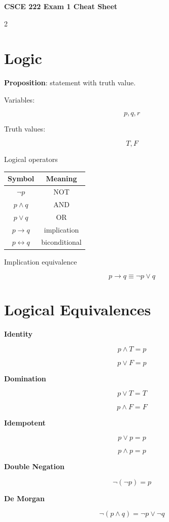 \documentclass[9pt]{article}
\begin{document}
\begin{center}
\Large \textbf{CSCE 222 Exam 1 Cheat Sheet}
\end{center}

\begin{multicols}{2}

\section*{Logic}

\textbf{Proposition}: statement with truth value.

Variables:

\[
p,q,r
\]

Truth values:

\[
T,F
\]

Logical operators

\begin{tabular}{c|c}
Symbol & Meaning\\
\hline
$\neg p$ & NOT\\
$p\land q$ & AND\\
$p\lor q$ & OR\\
$p\rightarrow q$ & implication\\
$p\leftrightarrow q$ & biconditional
\end{tabular}

Implication equivalence

\[
p\rightarrow q \equiv \neg p \lor q
\]

\section*{Logical Equivalences}

\textbf{Identity}

\[
p\land T=p
\]

\[
p\lor F=p
\]

\textbf{Domination}

\[
p\lor T=T
\]

\[
p\land F=F
\]

\textbf{Idempotent}

\[
p\lor p=p
\]

\[
p\land p=p
\]

\textbf{Double Negation}

\[
\neg(\neg p)=p
\]

\textbf{De Morgan}

\[
\neg(p\land q)=\neg p\lor\neg q
\]


\end{multicols}
\end{document}
